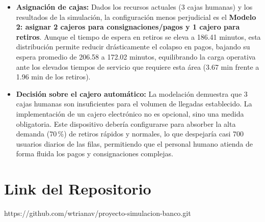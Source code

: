 \documentclass[12pt, a4paper]{article}
\begin{document}
\begin{itemize}
    \item \textbf{Asignación de cajas:} Dados los recursos actuales (3 cajas humanas) y los resultados de la simulación, la configuración menos perjudicial es el \textbf{Modelo 2: asignar 2 cajeros para consignaciones/pagos y 1 cajero para retiros}. Aunque el tiempo de espera en retiros se eleva a 186.41 minutos, esta distribución permite reducir drásticamente el colapso en pagos, bajando su espera promedio de 206.58 a 172.02 minutos, equilibrando la carga operativa ante los elevados tiempos de servicio que requiere esta área (3.67 min frente a 1.96 min de los retiros).
    
    \item \textbf{Decisión sobre el cajero automático:} La modelación demuestra que 3 cajas humanas son insuficientes para el volumen de llegadas establecido. La implementación de un cajero electrónico no es opcional, sino una medida obligatoria. Este dispositivo debería configurarse para absorber la alta demanda (70\,\%) de retiros rápidos y normales, lo que despejaría casi 700 usuarios diarios de las filas, permitiendo que el personal humano atienda de forma fluida los pagos y consignaciones complejas.
\end{itemize}

\section{Link del Repositorio}
https://github.com/wtrianav/proyecto-simulacion-banco.git
\end{document}
